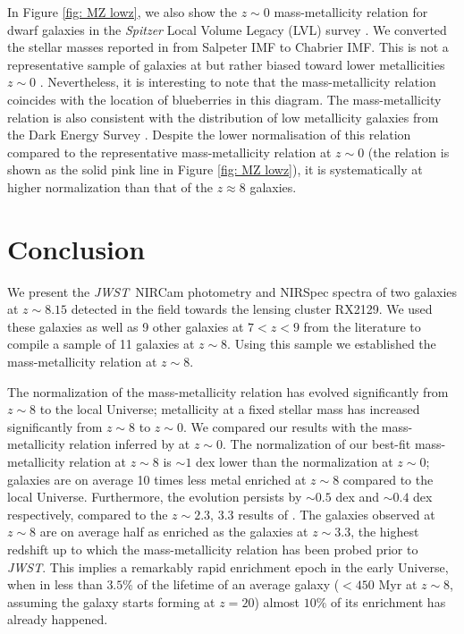 \documentclass[twocolumn]{aastex631}
\newcommand{\jwst}{{\em JWST}}
\begin{document}
In Figure \ref{fig: MZ lowz}, we also show the \cite{berg+2012} $z \sim 0$ mass-metallicity relation for dwarf galaxies in the \textit{Spitzer} Local Volume Legacy (LVL) survey \citep{2009ApJ...703..517D}. We converted the stellar masses reported in \cite{berg+2012} from Salpeter IMF to Chabrier IMF. This is not a representative sample of galaxies at but rather biased toward lower metallicities $z \sim 0$ \citep[e.g. see the discussion in][]{curti+2020b}. Nevertheless, it is interesting to note that the \cite{berg+2012} mass-metallicity relation coincides with the location of blueberries in this diagram. The \cite{berg+2012} mass-metallicity relation is also consistent with the distribution of low metallicity galaxies from the Dark Energy Survey \citep{2022arXiv221102094L}. Despite the lower normalisation of this relation compared to the representative mass-metallicity relation at $z \sim 0$ (the \cite{curti+2020b} relation is shown as the solid pink line in Figure \ref{fig: MZ lowz}), it is systematically at higher normalization than that of the $z\approx8$ galaxies. 



\section{Conclusion} \label{sec: conclusion}

We present the \jwst\ NIRCam photometry and NIRSpec spectra of two galaxies at $z \sim 8.15$ detected in the field towards the lensing cluster RX2129. We used these galaxies as well as 9 other galaxies at $7 < z < 9$ from the literature to compile a sample of 11 galaxies at $z \sim 8$. Using this sample we established the mass-metallicity relation at $z \sim 8$.

The normalization of the mass-metallicity relation has evolved significantly from $z \sim 8$ to the local Universe; metallicity at a fixed stellar mass has increased significantly from $z \sim 8$ to $z \sim 0$. We compared our results with the mass-metallicity relation inferred by \cite{sanders+2021} at $z \sim 0$. The normalization of our best-fit mass-metallicity relation at $z \sim 8$ is $\sim 1$ dex lower than the normalization at $z \sim 0$; galaxies are on average 10 times less metal enriched at $z \sim 8$ compared to the local Universe. Furthermore, the evolution persists by $\sim 0.5$ dex and $\sim 0.4$ dex respectively, compared to the $z \sim 2.3$, 3.3 results of \cite{sanders+2021}. The galaxies observed at $z \sim 8$ are on average half as enriched as the galaxies at $z \sim 3.3$, the highest redshift up to which the mass-metallicity relation has been probed prior to \jwst. This implies a remarkably rapid enrichment epoch in the early Universe, when in less than $3.5\%$ of the lifetime of an average galaxy ($ < 450$ Myr at $z \sim 8$, assuming the galaxy starts forming at $z = 20$) almost $10\%$ of its enrichment has already happened. 
    
\end{document}
